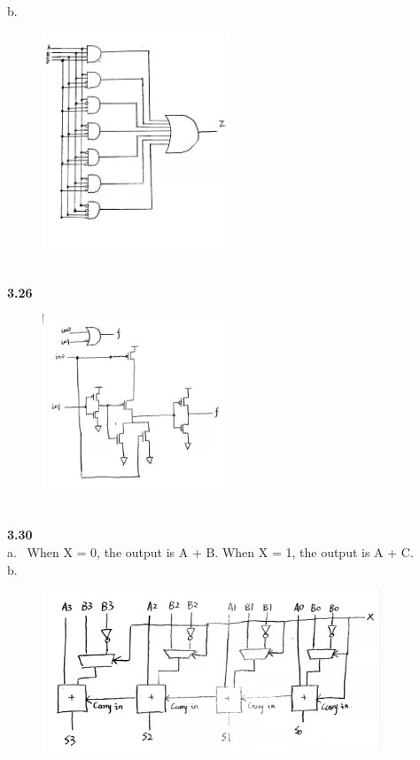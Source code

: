 \documentclass[a4paper,12pt]{article}     %
\begin{document}
\newpage
b. \ \begin{figure}[h] \includegraphics[width = 0.5\textwidth]{fig/fig1.jpeg} \end{figure}\\

\newpage
\textbf{3.26}\\
\begin{figure}[h] \includegraphics[width = 0.5\textwidth]{fig/fig2.jpeg} \end{figure}\\

\textbf{3.30}\\
a. \ When X = 0, the output is A + B. When X = 1, the output is A + C.\\
b. \ \begin{figure}[h] \includegraphics[width = 0.9\textwidth]{fig/fig3.jpeg} \end{figure}
\end{document}
